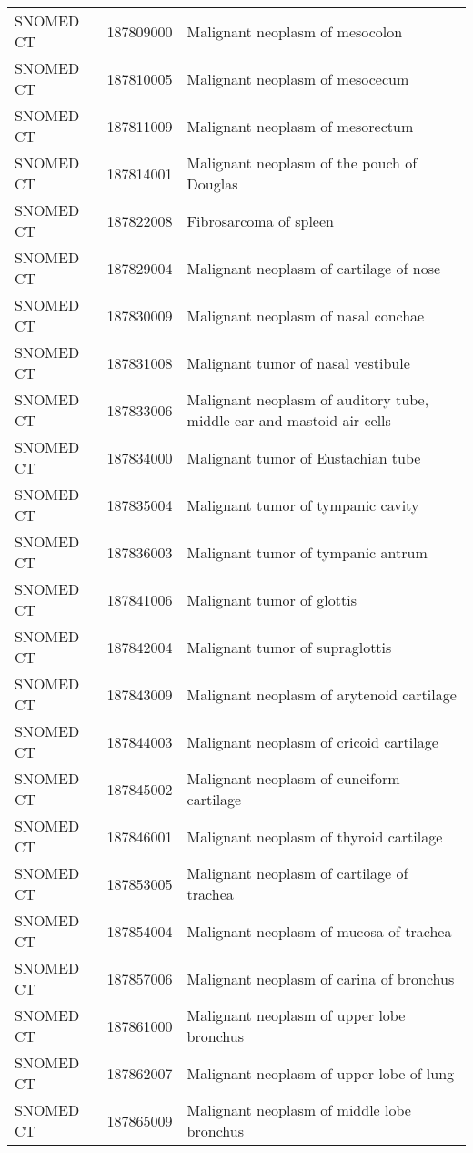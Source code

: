 \begin{longtable}{p{}p{}p{}}
  SNOMED CT & 187809000 & Malignant neoplasm of mesocolon \\ 
  SNOMED CT & 187810005 & Malignant neoplasm of mesocecum \\ 
  SNOMED CT & 187811009 & Malignant neoplasm of mesorectum \\ 
  SNOMED CT & 187814001 & Malignant neoplasm of the pouch of Douglas \\ 
  SNOMED CT & 187822008 & Fibrosarcoma of spleen \\ 
  SNOMED CT & 187829004 & Malignant neoplasm of cartilage of nose \\ 
  SNOMED CT & 187830009 & Malignant neoplasm of nasal conchae \\ 
  SNOMED CT & 187831008 & Malignant tumor of nasal vestibule \\ 
  SNOMED CT & 187833006 & Malignant neoplasm of auditory tube, middle ear and mastoid air cells \\ 
  SNOMED CT & 187834000 & Malignant tumor of Eustachian tube \\ 
  SNOMED CT & 187835004 & Malignant tumor of tympanic cavity \\ 
  SNOMED CT & 187836003 & Malignant tumor of tympanic antrum \\ 
  SNOMED CT & 187841006 & Malignant tumor of glottis \\ 
  SNOMED CT & 187842004 & Malignant tumor of supraglottis \\ 
  SNOMED CT & 187843009 & Malignant neoplasm of arytenoid cartilage \\ 
  SNOMED CT & 187844003 & Malignant neoplasm of cricoid cartilage \\ 
  SNOMED CT & 187845002 & Malignant neoplasm of cuneiform cartilage \\ 
  SNOMED CT & 187846001 & Malignant neoplasm of thyroid cartilage \\ 
  SNOMED CT & 187853005 & Malignant neoplasm of cartilage of trachea \\ 
  SNOMED CT & 187854004 & Malignant neoplasm of mucosa of trachea \\ 
  SNOMED CT & 187857006 & Malignant neoplasm of carina of bronchus \\ 
  SNOMED CT & 187861000 & Malignant neoplasm of upper lobe bronchus \\ 
  SNOMED CT & 187862007 & Malignant neoplasm of upper lobe of lung \\ 
  SNOMED CT & 187865009 & Malignant neoplasm of middle lobe bronchus \\ 

\end{longtable}
